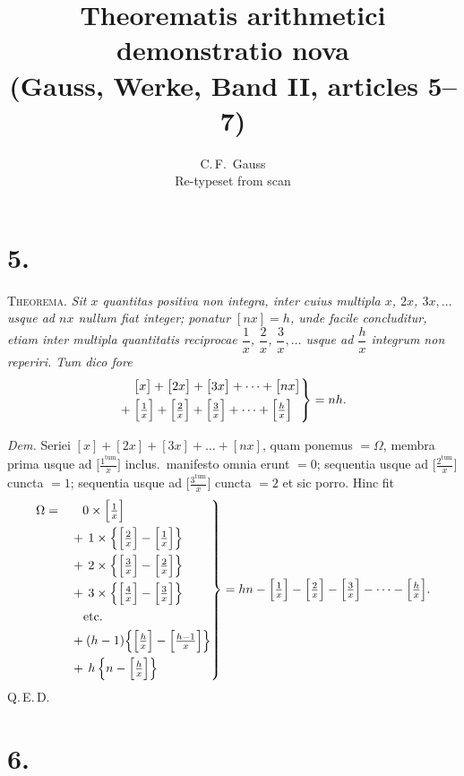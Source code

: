 \documentclass[11pt]{article}
\title{Theorematis arithmetici demonstratio nova\\[2pt]
\large (Gauss, Werke, Band II, articles 5--7)}
\author{C.\,F.\ Gauss\\[2pt]\normalsize Re-typeset from scan}
\date{}
\begin{document}
\maketitle

\section*{5.}

\textsc{Theorema.} \emph{Sit $x$ quantitas positiva non integra, inter cuius
multipla $x$, $2x$, $3x,\dots$ usque ad $nx$ nullum fiat integer; ponatur
$[nx]=h$, unde facile concluditur, etiam inter multipla quantitatis reciprocae
$\dfrac{1}{x}$, $\dfrac{2}{x}$, $\dfrac{3}{x},\dots$ usque ad $\dfrac{h}{x}$
integrum non reperiri. Tum dico fore}
\[
  \left.
  \begin{aligned}
  &\bigl[x\bigr]+\bigl[2x\bigr]+\bigl[3x\bigr]+\dots+\bigl[nx\bigr]\\
  +\;&\Bigl[\tfrac{1}{x}\Bigr]+\Bigl[\tfrac{2}{x}\Bigr]+\Bigl[\tfrac{3}{x}\Bigr]
       +\dots+\Bigl[\tfrac{h}{x}\Bigr]
  \end{aligned}
  \right\}=nh.
\]

\medskip
\emph{Dem.} Seriei $[x]+[2x]+[3x]+\dots+[nx]$, quam ponemus $=\Omega$, membra
prima usque ad $\bigl[\tfrac{1^{\text{tum}}}{x}\bigr]$ inclus.\ manifesto omnia
erunt $=0$; sequentia usque ad $\bigl[\tfrac{2^{\text{tum}}}{x}\bigr]$ cuncta
$=1$; sequentia usque ad $\bigl[\tfrac{3^{\text{tum}}}{x}\bigr]$ cuncta $=2$
et sic porro. Hinc fit
\[
  \left.
  \begin{aligned}
  \Omega=\quad &\phantom{+\,}0\times\Bigl[\tfrac{1}{x}\Bigr]\\
  &+\,1\times\Bigl\{\Bigl[\tfrac{2}{x}\Bigr]-\Bigl[\tfrac{1}{x}\Bigr]\Bigr\}\\
  &+\,2\times\Bigl\{\Bigl[\tfrac{3}{x}\Bigr]-\Bigl[\tfrac{2}{x}\Bigr]\Bigr\}\\
  &+\,3\times\Bigl\{\Bigl[\tfrac{4}{x}\Bigr]-\Bigl[\tfrac{3}{x}\Bigr]\Bigr\}\\
  &\quad\text{etc.}\\
  &+(h-1)\Bigl\{\Bigl[\tfrac{h}{x}\Bigr]-\Bigl[\tfrac{h-1}{x}\Bigr]\Bigr\}\\
  &+\,h\,\Bigl\{n-\Bigl[\tfrac{h}{x}\Bigr]\Bigr\}
  \end{aligned}
  \right\}
  = hn-\Bigl[\tfrac{1}{x}\Bigr]-\Bigl[\tfrac{2}{x}\Bigr]-\Bigl[\tfrac{3}{x}\Bigr]
        -\dots-\Bigl[\tfrac{h}{x}\Bigr].
\]
\textsc{Q.\,E.\,D.}

\section*{6.}
\end{document}
